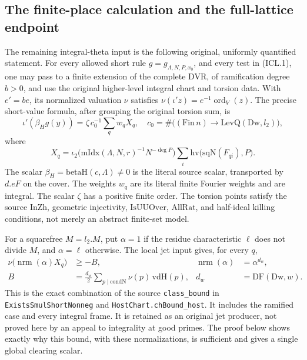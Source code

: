 \documentclass[11pt,a4paper]{article}
\numberwithin{equation}{section}
\theoremstyle{remark}\newtheorem{remark}[theorem]{Remark}
\begin{document}

\subsection{The finite-place calculation and the full-lattice endpoint}

The remaining integral-theta input is the following original,
uniformly quantified statement.  For every allowed short
rule \(g=g_{\Lambda,N,P,x_0}\), and every test in (ICL.1),
one may pass to a finite extension of the complete DVR,
of ramification degree \(b>0\), and use the original
higher-level integral chart and torsion data.  With
\(e'=be\), its normalized valuation \(\nu\) satisfies
\(\nu(\iota' z)=e^{-1}\operatorname{ord}_{V}(z)\).
The precise short-value formula, after grouping the
original torsion sum, is
\[
 \iota'(\beta_H g(y))
       =\zeta\,c_0^{-1}\sum_{q}w_q X_q,
 \quad c_0=\#\bigl((\mathrm{Fin}\,n)\to
                              \mathrm{LevQ}(\mathrm{Dw},l_2)\bigr),
                                                               \tag{ICL.13}
\]
where
\[
 X_q=\iota_2\bigl(\mathrm{mIdx}(\Lambda,N,r)^{-1}
                                     N^{-\deg P}\bigr)
       \sum_i\mathrm{hv}\bigl(\mathrm{sqN}(F_{qi}),P\bigr).
\]
The scalar \(\beta_H=\mathrm{betaH}(c,\Lambda)\ne0\)
is the literal source scalar, transported by \(d.eF\)
on the cover.  The weights \(w_q\) are its literal finite
Fourier weights and are integral.  The scalar \(\zeta\)
has a positive finite order.  The torsion points satisfy
the source \(\mathrm{InZh}\), geometric injectivity,
\(\mathrm{IsUUOver}\), \(\mathrm{AllRat}\), and
half-ideal killing conditions, not merely an abstract
finite-set model.

For a squarefree \(M=l_2.M\), put \(\alpha=1\) if
the residue characteristic \(\ell\) does not divide
\(M\), and \(\alpha=\ell\) otherwise.  The local
jet input gives, for every \(q\),
\begin{align}
 \nu\bigl(\operatorname{nrm}(\alpha)X_q\bigr)&\geq-B,
       &\operatorname{nrm}(\alpha)&=\alpha^{d_w},       \tag{ICL.14}\\
 B&=\frac{d_w}{2}\sum_{p\mid\mathrm{condN}}
                        \nu(p)\,\mathrm{vdH}(p),
       &d_w&=\mathrm{DF}(\mathrm{Dw},w).               \tag{ICL.15}
\end{align}
This is the exact combination of the source
\texttt{class\_\allowbreak bound} in \texttt{Exists\allowbreak Smul\allowbreak Short\allowbreak Nonneg}
and \texttt{Host\allowbreak Chart.\allowbreak ch\allowbreak Bound\_\allowbreak host}.  It includes the
ramified case and every integral frame.  It is retained
as an original jet producer, not proved here by an
appeal to integrality at good primes.  The proof below
shows exactly why this bound, with these normalizations,
is sufficient and gives a single global clearing scalar.
\end{document}

